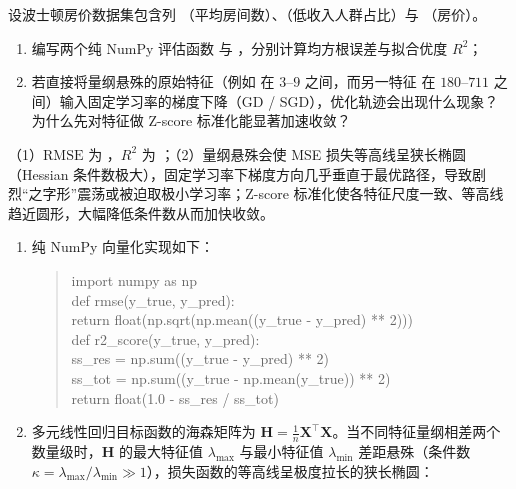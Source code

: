 \begin{exercise}[title={波士顿房价回归评估与特征标准化对 SGD 的影响},level=advanced,points=18,tags={多元线性回归,SGD,特征标准化,RMSE}]
设波士顿房价数据集包含列 （平均房间数）、（低收入人群占比）与 （房价）。
\begin{enumerate}
  \item 编写两个纯 NumPy 评估函数  与 ，分别计算均方根误差与拟合优度 $R^2$；
  \item 若直接将量纲悬殊的原始特征（例如  在 $3$–$9$ 之间，而另一特征  在 $180$–$711$ 之间）输入固定学习率的梯度下降（GD / SGD），优化轨迹会出现什么现象？为什么先对特征做 Z-score 标准化能显著加速收敛？
\end{enumerate}
\begin{answer}
（1）$\mathrm{RMSE}$ 为 ，$R^2$ 为 ；（2）量纲悬殊会使 MSE 损失等高线呈狭长椭圆（Hessian 条件数极大），固定学习率下梯度方向几乎垂直于最优路径，导致剧烈“之字形”震荡或被迫取极小学习率；Z-score 标准化使各特征尺度一致、等高线趋近圆形，大幅降低条件数从而加快收敛。
\end{answer}
\begin{solution}
\begin{enumerate}
  \item 纯 NumPy 向量化实现如下：
  \begin{quote}\ttfamily\small
    import numpy as np\\
    def rmse(y\_true, y\_pred):\\
    \hspace*{2em}return float(np.sqrt(np.mean((y\_true - y\_pred) ** 2)))\\
    def r2\_score(y\_true, y\_pred):\\
    \hspace*{2em}ss\_res = np.sum((y\_true - y\_pred) ** 2)\\
    \hspace*{2em}ss\_tot = np.sum((y\_true - np.mean(y\_true)) ** 2)\\
    \hspace*{2em}return float(1.0 - ss\_res / ss\_tot)
  \end{quote}
  \item 多元线性回归目标函数的海森矩阵为 $\bm{H} = \frac{1}{n}\bm{X}^\top\bm{X}$。当不同特征量纲相差两个数量级时，$\bm{H}$ 的最大特征值 $\lambda_{\max}$ 与最小特征值 $\lambda_{\min}$ 差距悬殊（条件数 $\kappa = \lambda_{\max}/\lambda_{\min} \gg 1$），损失函数的等高线呈极度拉长的狭长椭圆：

\end{enumerate}
\end{solution}
\end{exercise}
